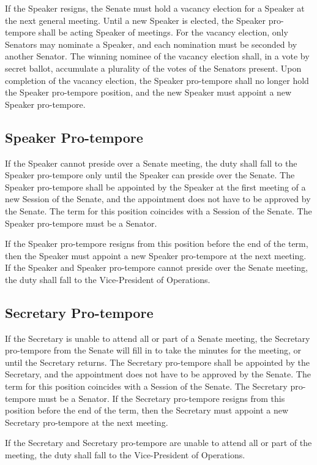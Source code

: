 \documentclass[12pt]{scrreprt}
\begin{document}
If the Speaker resigns, the Senate must hold a vacancy election for a Speaker at the next
general meeting. Until a new Speaker is elected, the Speaker pro-tempore shall be acting
Speaker of meetings. For the vacancy election, only Senators may nominate a Speaker, and
each nomination must be seconded by another Senator. The winning nominee of the vacancy
election shall, in a vote by secret ballot, accumulate a plurality of the votes of the Senators
present. Upon completion of the vacancy election, the Speaker pro-tempore shall no longer hold
the Speaker pro-tempore position, and the new Speaker must appoint a new Speaker
pro-tempore.

\subsection{Speaker Pro-tempore}
If the Speaker cannot preside over a Senate meeting, the duty shall fall to the Speaker
pro-tempore only until the Speaker can preside over the Senate. The Speaker pro-tempore shall
be appointed by the Speaker at the first meeting of a new Session of the Senate, and the
appointment does not have to be approved by the Senate. The term for this position coincides
with a Session of the Senate. The Speaker pro-tempore must be a Senator. 

If the Speaker
pro-tempore resigns from this position before the end of the term, then the Speaker must
appoint a new Speaker pro-tempore at the next meeting.
If the Speaker and Speaker pro-tempore cannot preside over the Senate meeting, the duty shall
fall to the Vice-President of Operations.

\subsection{Secretary Pro-tempore}
If the Secretary is unable to attend all or part of a Senate meeting, the Secretary pro-tempore
from the Senate will fill in to take the minutes for the meeting, or until the Secretary returns. The
Secretary pro-tempore shall be appointed by the Secretary, and the appointment does not have
to be approved by the Senate. The term for this position coincides with a Session of the Senate.
The Secretary pro-tempore must be a Senator. If the Secretary pro-tempore resigns from this
position before the end of the term, then the Secretary must appoint a new Secretary
pro-tempore at the next meeting.

If the Secretary and Secretary pro-tempore are unable to attend all or part of the meeting, the
duty shall fall to the Vice-President of Operations.
\end{document}
